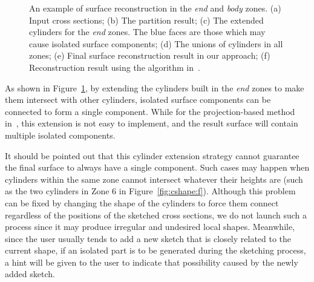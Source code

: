 \begin{figure} [htbp]
{\begin{minipage}[b]{0.3\textwidth}
    \end{minipage}}
  \caption{An example of surface reconstruction in the \textit{end} and \textit{body} zones. (a) Input cross sections; (b) The partition result; (c) The extended cylinders for the \textit{end} zones.  The blue faces are those which may cause isolated surface components; (d) The unions of cylinders in all zones; (e) Final surface reconstruction result in our approach; (f) Reconstruction result using the algorithm in~\cite{LBDLJ08}.}
  \label{fig:partition} %
\end{figure}

As shown in Figure~\ref{fig:partition}, by extending the cylinders
built in the \textit{end} zones to make them intersect with other
cylinders, isolated surface components can be connected to form a
single component. While for the projection-based method
in~\cite{LBDLJ08}, this extension is not easy to implement, and the
result surface will contain multiple isolated components.

It should be pointed out that this cylinder extension  strategy
cannot guarantee the final surface to always have a single
component. Such cases may happen when cylinders within the same zone
cannot intersect whatever their heights are (such as the two
cylinders in Zone 6 in Figure~\ref{fig:cshape:f}). Although this
problem can be fixed by changing the shape of the cylinders to force
them connect regardless of the positions of the sketched cross
sections, we do not launch such a process since it may produce
irregular and undesired local shapes. Meanwhile, since the user
usually tends to add a new sketch that is closely related to the
current shape, if an isolated part is to be generated during the
sketching process, a hint will be given to the user to indicate that
possibility caused by the newly added sketch.


